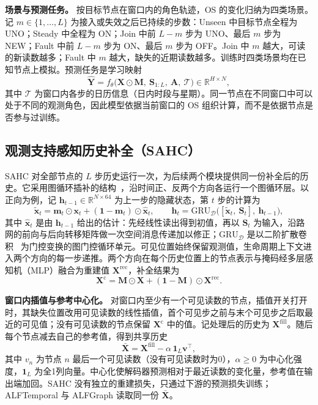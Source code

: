 \textbf{场景与预测任务。} 按目标节点在窗口内的角色轨迹，OS 的变化归纳为四类场景。记 $m\in\{1,\dots,L\}$ 为接入或失效之后已持续的步数：Unseen 中目标节点全程为 UNO；Steady 中全程为 ON；Join 中前 $L-m$ 步为 UNO、最后 $m$ 步为 NEW；Fault 中前 $L-m$ 步为 ON、最后 $m$ 步为 OFF。Join 中 $m$ 越大，可读的新读数越多；Fault 中 $m$ 越大，缺失的近期读数越多。训练时四类场景均在已知节点上模拟。预测任务是学习映射
\begin{equation}\label{eq:2}
\hat{\mathbf{Y}}=f_{\theta}\big(\mathbf{X}\odot\mathbf{M},\ \mathbf{S}_{1:L},\ \mathbf{A},\ \mathcal{T}\big)\in\mathbb{R}^{H\times N},
\end{equation}
其中 $\mathcal{T}$ 为窗口内各步的日历信息（日内时段与星期）。同一节点在不同窗口中可以处于不同的观测角色，因此模型依据当前窗口的 OS 组织计算，而不是依据节点是否参与过训练。

\subsection{观测支持感知历史补全（SAHC）}\label{sec:3_2}

SAHC 对全部节点的 $L$ 步历史运行一次，为后续两个模块提供同一份补全后的历史。它采用图循环插补的结构~\citep{cini2022filling}，沿时间正、反两个方向各运行一个图循环层。以正向为例，记 $\mathbf{h}_{t-1}\in\mathbb{R}^{N\times64}$ 为上一步的隐藏状态，第 $t$ 步的计算为
\begin{equation}\label{eq:3}
\tilde{\mathbf{x}}_t=\mathbf{m}_t\odot\mathbf{x}_t+(\mathbf{1}-\mathbf{m}_t)\odot\hat{\mathbf{x}}_t,\qquad \mathbf{h}_t=\mathrm{GRU}_{\mathcal{D}}\big([\tilde{\mathbf{x}}_t,\ \mathbf{S}_t],\ \mathbf{h}_{t-1}\big),
\end{equation}
其中 $\hat{\mathbf{x}}_t$ 是由 $\mathbf{h}_{t-1}$ 给出的估计：先经线性读出得到初值，再以 $\mathbf{S}_t$ 为输入，沿路网的前向与后向转移矩阵做一次空间消息传递加以修正；$\mathrm{GRU}_{\mathcal{D}}$ 是以二阶扩散卷积~\citep{li2018diffusion} 为门控变换的图门控循环单元。可见位置始终保留观测值，生命周期上下文进入两个方向的每一步递推。两个方向在每个历史位置上的节点表示与掩码经多层感知机（MLP）融合为重建值 $\mathbf{X}^{\mathrm{rec}}$，补全结果为
\begin{equation}\label{eq:4}
\mathbf{X}^{\mathrm{c}}=\mathbf{M}\odot\mathbf{X}+(\mathbf{1}-\mathbf{M})\odot\mathbf{X}^{\mathrm{rec}}.
\end{equation}

\textbf{窗口内插值与参考中心化。} 对窗口内至少有一个可见读数的节点，插值开关打开时，其缺失位置改用可见读数的线性插值，首个可见步之前与末个可见步之后取最近的可见值；没有可见读数的节点保留 $\mathbf{X}^{\mathrm{c}}$ 中的值。记处理后的历史为 $\mathbf{X}^{\mathrm{fill}}$。随后每个节点减去自己的参考值，得到共享历史
\begin{equation}\label{eq:5}
\bar{\mathbf{X}}=\mathbf{X}^{\mathrm{fill}}-\alpha\,\mathbf{1}_L\mathbf{v}^{\top},
\end{equation}
其中 $v_n$ 为节点 $n$ 最后一个可见读数（没有可见读数时为0），$\alpha\ge0$ 为中心化强度，$\mathbf{1}_L$ 为全1列向量。中心化使解码器预测相对于最近读数的变化量，参考值在输出端加回。SAHC 没有独立的重建损失，只通过下游的预测损失训练；ALFTemporal 与 ALFGraph 读取同一份 $\bar{\mathbf{X}}$。

